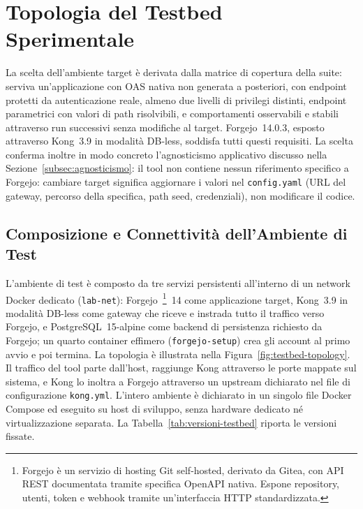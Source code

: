 \section{Topologia del Testbed Sperimentale}%
\label{sec:testbed}

La scelta dell'ambiente target è derivata dalla matrice di copertura della suite: serviva un'applicazione con \gls{OAS} nativa non generata a posteriori, con endpoint protetti da autenticazione reale, almeno due livelli di privilegi distinti, endpoint parametrici con valori di path risolvibili, e comportamenti osservabili e stabili attraverso run successivi senza modifiche al target. Forgejo~14.0.3, esposto attraverso Kong~3.9 in modalità DB-less, soddisfa tutti questi requisiti. La scelta conferma inoltre in modo concreto l'agnosticismo applicativo discusso nella Sezione~\ref{subsec:agnosticismo}: il tool non contiene nessun riferimento specifico a Forgejo: cambiare target significa aggiornare i valori nel \texttt{config.yaml} (URL del gateway, percorso della specifica, path seed, credenziali), non modificare il codice.


\subsection{Composizione e Connettività dell'Ambiente di Test}\label{subsec:architettura-testbed}


L'ambiente di test è composto da tre servizi persistenti all'interno di un network Docker dedicato (\texttt{lab-net}): Forgejo~\cite{forgejoContributors2026}\footnote{Forgejo è un servizio di hosting Git self-hosted, derivato da Gitea, con \gls{API} REST documentata tramite specifica OpenAPI nativa. Espone repository, utenti, token e webhook tramite un'interfaccia \gls{HTTP} standardizzata.}~14 come applicazione target, Kong~3.9 in modalità DB-less come gateway che riceve e instrada tutto il traffico verso Forgejo, e PostgreSQL~15-alpine come backend di persistenza richiesto da Forgejo; un quarto container effimero (\texttt{forgejo-setup}) crea gli account al primo avvio e poi termina. La topologia è illustrata nella Figura~\ref{fig:testbed-topology}. Il traffico del tool parte dall'host, raggiunge Kong attraverso le porte mappate sul sistema, e Kong lo inoltra a Forgejo attraverso un upstream dichiarato nel file di configurazione \texttt{kong.yml}. L'intero ambiente è dichiarato in un singolo file Docker Compose ed eseguito su host di sviluppo, senza hardware dedicato né virtualizzazione separata. La Tabella~\ref{tab:versioni-testbed} riporta le versioni fissate.

